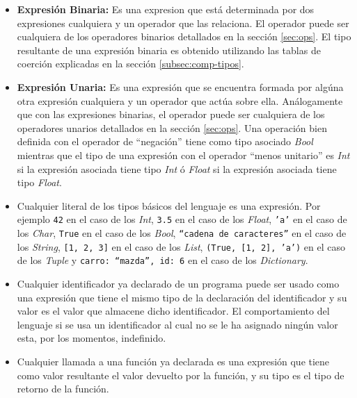 \documentclass[12pt, spanish]{report}
\begin{document}
\begin{itemize}
\item \textbf{Expresi\'on Binaria:} Es una expresion que est\'a
  determinada por dos expresiones cualquiera y un operador que las
  relaciona. El operador puede ser cualquiera de los operadores
  binarios detallados en la secci\'on \ref{sec:ops}. El tipo
  resultante de una expresión binaria es obtenido utilizando las
  tablas de coerción explicadas en la sección \ref{subsec:comp-tipos}.
      
\item \textbf{Expresi\'on Unaria:} Es una expresi\'on que se encuentra
  formada por alg\'una otra expresi\'on cualquiera y un operador que
  act\'ua sobre ella. An\'alogamente que con las expresiones binarias,
  el operador puede ser cualquiera de los operadores unarios
  detallados en la secci\'on \ref{sec:ops}. Una operación bien
  definida con el operador de ``negación'' tiene como tipo asociado
  \emph{Bool} mientras que el tipo de una expresión con el operador
  ``menos unitario'' es \emph{Int} si la expresión asociada tiene tipo
  \emph{Int} ó \emph{Float} si la expresión asociada tiene tipo
  \emph{Float}.
       
\item Cualquier literal de los tipos b\'asicos del lenguaje es una
  expresi\'on. Por ejemplo \texttt{42} en el caso de los \emph{Int},
  \texttt{3.5} en el caso de los \emph{Float}, \texttt{'a'} en el caso
  de los \emph{Char}, \texttt{True} en el caso de los \emph{Bool},
  \texttt{``cadena de caracteres''} en el caso de los \emph{String},
  \texttt{[1, 2, 3]} en el caso de los \emph{List}, \texttt{(True, [1,
    2], 'a')} en el caso de los \emph{Tuple} y \texttt{{carro:
      ``mazda'', id: 6}} en el caso de los \emph{Dictionary}.
       
\item Cualquier identificador ya declarado de un programa puede ser
  usado como una expresi\'on que tiene el mismo tipo de la
  declaraci\'on del identificador y su valor es el valor que almacene
  dicho identificador. El comportamiento del lenguaje si se usa un
  identificador al cual no se le ha asignado ning\'un valor esta, por
  los momentos, indefinido.
       
\item Cualquier llamada a una funci\'on ya declarada es una
  expresi\'on que tiene como valor resultante el valor devuelto por la
  funci\'on, y su tipo es el tipo de retorno de la funci\'on.
\end{itemize}
\end{document}
